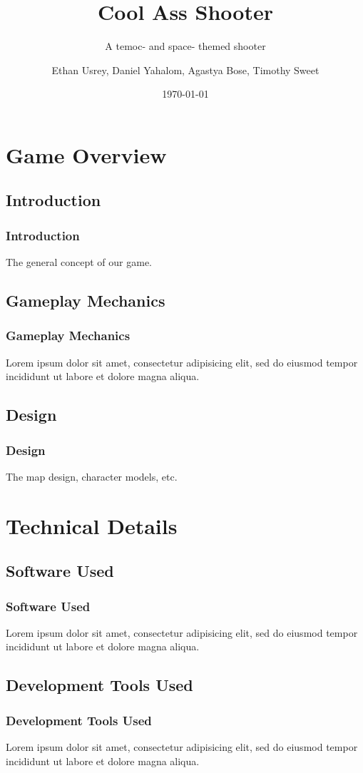 \documentclass{beamer}
\title{Cool Ass Shooter}
\subtitle{A temoc- and space- themed shooter}
\author{Ethan Usrey, Daniel Yahalom, Agastya Bose, Timothy Sweet}
\institute{The University of Texas at Dallas}
\date{\today}
\begin{document}
\begin{frame}
\titlepage
\end{frame}

\section{Game Overview}
\subsection{Introduction}

\begin{frame}
\frametitle{Introduction}
The general concept of our game.
\end{frame}

\subsection{Gameplay Mechanics}

\begin{frame}
\frametitle{Gameplay Mechanics}
Lorem ipsum dolor sit amet, consectetur adipisicing elit, sed do eiusmod tempor incididunt ut labore et dolore magna aliqua.
\end{frame}

\subsection{Design}

\begin{frame}
\frametitle{Design}
The map design, character models, etc.
\end{frame}

\section{Technical Details}

\subsection{Software Used}
\begin{frame}
\frametitle{Software Used}
Lorem ipsum dolor sit amet, consectetur adipisicing elit, sed do eiusmod tempor incididunt ut labore et dolore magna aliqua.
\end{frame}

\subsection{Development Tools Used}
\begin{frame}
\frametitle{Development Tools Used}
Lorem ipsum dolor sit amet, consectetur adipisicing elit, sed do eiusmod tempor incididunt ut labore et dolore magna aliqua.
\end{frame}
\end{document}
